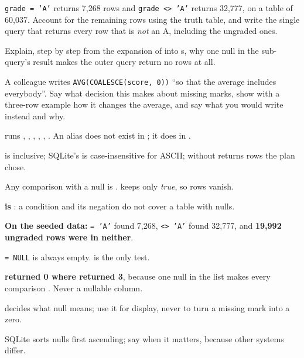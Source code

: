 \begin{checkpoint}
\begin{tightnum}
  \item \texttt{grade = 'A'} returns 7{,}268 rows and \texttt{grade <> 'A'}
        returns 32{,}777, on a table of 60{,}037. Account for the remaining
        rows using the truth table, and write the single query that returns
        every row that is \emph{not} an A, including the ungraded ones.
  \item Explain, step by step from the expansion of  into
        s, why one null in the sub-query's result makes the outer
        query return no rows at all.
  \item A colleague writes \texttt{AVG(COALESCE(score, 0))} ``so that the
        average includes everybody''. Say what decision this makes about
        missing marks, show with a three-row example how it changes the
        average, and say what you would write instead and why.
\end{tightnum}
\end{checkpoint}

\begin{chaptersummary}
\begin{tight}
  \item {} runs , , ,
        , , . An alias does not
        exist in ; it does in .
  \item {} is inclusive; SQLite's  is
        case-insensitive for ASCII;  without 
        returns rows the plan chose.
  \item Any comparison with a null is \textbf{\unk{}}.
         keeps only \emph{true}, so \unk{} rows vanish.
  \item \textbf{ \unk{} is \unk{}}: a condition
        and its negation do not cover a table with nulls.
  \item \textbf{On the seeded data:} \texttt{= 'A'} found 7{,}268,
        \texttt{<> 'A'} found 32{,}777, and \textbf{19{,}992 ungraded rows were
        in neither}.
  \item \texttt{= NULL} is always empty.  is the only test.
  \item \textbf{ returned 0 where  returned 3},
        because one null in the list makes every comparison \unk{}.
        Never  a nullable column.
  \item {} decides what null means; use it for display, never to
        turn a missing mark into a zero.
  \item SQLite sorts nulls first ascending; say  when it
        matters, because other systems differ.
\end{tight}
\end{chaptersummary}


